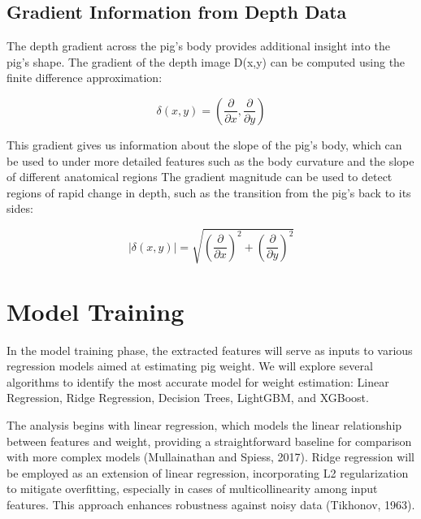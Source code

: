 {\subsection{Gradient Information from Depth Data}
The depth gradient across the pig’s body provides additional insight into the pig’s shape. The gradient of the depth image D(x,y) can be computed using the finite difference approximation:

\myequation{}
\begin{equation}
	\delta(x,y)= (\frac{\partial}{\partial x} , \frac{\partial}{\partial y})
\end{equation}

This gradient gives us information about the slope of the pig’s body, which can be used to under more detailed features such as the body curvature and the slope of different anatomical regions The gradient magnitude can be used to detect regions of rapid change in depth, such as the transition from the pig’s back to its sides:

\myequation{}
\begin{equation}
	\left| \delta(x,y) \right| = \sqrt{\left( \frac{\partial}{\partial x} \right)^2 + \left( \frac{\partial}{\partial y} \right)^2}
\end{equation}

\section{Model Training}
In the model training phase, the extracted features will serve as inputs to various regression models aimed at estimating pig weight. We will explore several algorithms to identify the most accurate model for weight estimation: Linear Regression, Ridge Regression, Decision Trees, LightGBM, and XGBoost.

The analysis begins with linear regression, which models the linear relationship between features and weight, providing a straightforward baseline for comparison with more complex models (Mullainathan and Spiess, 2017). Ridge regression will be employed as an extension of linear regression, incorporating L2 regularization to mitigate overfitting, especially in cases of multicollinearity among input features. This approach enhances robustness against noisy data (Tikhonov, 1963).

}
